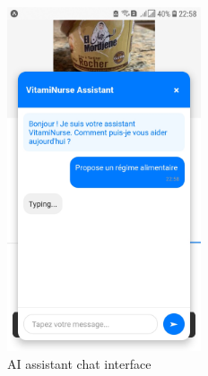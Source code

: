 \begin{center}
\begin{figure}[H]
\centering
\includegraphics[width=0.51\textwidth]{images/chat_interface.jpg}
\caption{AI assistant chat interface} 
\label{fig:chatbot_interface}
\end{figure}
\end{center}


